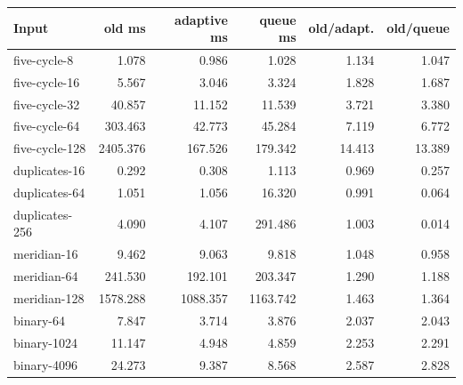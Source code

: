 \begin{center}\small
\begin{tabular}{@{}lrrrrr@{}}
\toprule
Input & old ms & adaptive ms & queue ms & old/adapt. & old/queue \\
\midrule
five-cycle-8 & 1.078 & 0.986 & 1.028 & 1.134 & 1.047 \\
five-cycle-16 & 5.567 & 3.046 & 3.324 & 1.828 & 1.687 \\
five-cycle-32 & 40.857 & 11.152 & 11.539 & 3.721 & 3.380 \\
five-cycle-64 & 303.463 & 42.773 & 45.284 & 7.119 & 6.772 \\
five-cycle-128 & 2405.376 & 167.526 & 179.342 & 14.413 & 13.389 \\
duplicates-16 & 0.292 & 0.308 & 1.113 & 0.969 & 0.257 \\
duplicates-64 & 1.051 & 1.056 & 16.320 & 0.991 & 0.064 \\
duplicates-256 & 4.090 & 4.107 & 291.486 & 1.003 & 0.014 \\
meridian-16 & 9.462 & 9.063 & 9.818 & 1.048 & 0.958 \\
meridian-64 & 241.530 & 192.101 & 203.347 & 1.290 & 1.188 \\
meridian-128 & 1578.288 & 1088.357 & 1163.742 & 1.463 & 1.364 \\
binary-64 & 7.847 & 3.714 & 3.876 & 2.037 & 2.043 \\
binary-1024 & 11.147 & 4.948 & 4.859 & 2.253 & 2.291 \\
binary-4096 & 24.273 & 9.387 & 8.568 & 2.587 & 2.828 \\
\bottomrule
\end{tabular}
\end{center}
